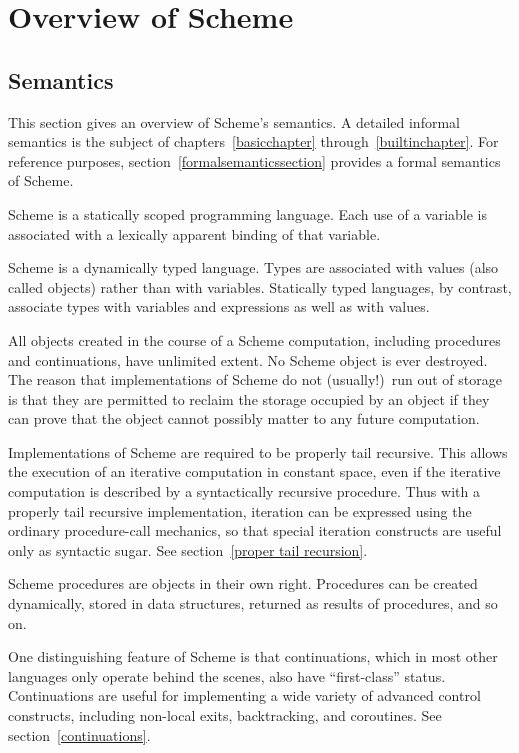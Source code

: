 
\chapter{Overview of Scheme}

\section{Semantics}
\label{semanticsection}

This section gives an overview of Scheme's semantics.  A
detailed informal semantics is the subject of
chapters~\ref{basicchapter} through~\ref{builtinchapter}.  For reference
purposes, section~\ref{formalsemanticssection} provides a formal
semantics of Scheme.

\vest Scheme is a statically scoped programming
language.  Each use of a variable is associated with a lexically
apparent binding of that variable.

\vest Scheme is a dynamically typed language.  Types
are associated with values (also called objects) rather than
with variables.  
Statically typed languages, by contrast, associate types with
variables and expressions as well as with values.

\vest All objects created in the course of a Scheme computation, including
procedures and continuations, have unlimited extent.
No Scheme object is ever destroyed.  The reason that
implementations of Scheme do not (usually!)\ run out of storage is that
they are permitted to reclaim the storage occupied by an object if
they can prove that the object cannot possibly matter to any future
computation.  

\vest Implementations of Scheme are required to be properly tail recursive.
This allows the execution of an iterative computation in constant space,
even if the iterative computation is described by a syntactically
recursive procedure.  Thus with a properly tail recursive implementation,
iteration can be expressed using the ordinary procedure-call
mechanics, so that special iteration constructs are useful only as
syntactic sugar.  See section~\ref{proper tail recursion}.

\vest Scheme procedures are objects in their own right.  Procedures can be
created dynamically, stored in data structures, returned as results of
procedures, and so on.  

\vest One distinguishing feature of Scheme is that continuations, which
in most other languages only operate behind the scenes, also have
``first-class'' status.  Continuations are useful for implementing a
wide variety of advanced control constructs, including non-local exits,
backtracking, and coroutines.  See section~\ref{continuations}.


